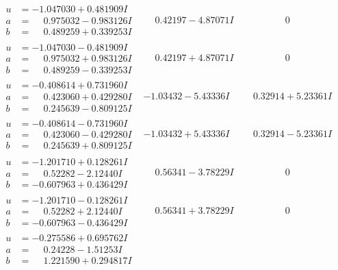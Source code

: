 \documentclass[1p]{elsarticle_modified}
\theoremstyle{definition}
\begin{document}
$$\begin{array}{c|c|c}
\begin{aligned}
u &= -1.047030 + 0.481909 I \\
a &= \phantom{-}0.975032 - 0.983126 I \\
b &= \phantom{-}0.489259 + 0.339253 I\end{aligned}
 & \phantom{-}0.42197 - 4.87071 I & \phantom{-0.000000 } 0 \\ \hline\begin{aligned}
u &= -1.047030 - 0.481909 I \\
a &= \phantom{-}0.975032 + 0.983126 I \\
b &= \phantom{-}0.489259 - 0.339253 I\end{aligned}
 & \phantom{-}0.42197 + 4.87071 I & \phantom{-0.000000 } 0 \\ \hline\begin{aligned}
u &= -0.408614 + 0.731960 I \\
a &= \phantom{-}0.423060 + 0.429280 I \\
b &= \phantom{-}0.245639 - 0.809125 I\end{aligned}
 & -1.03432 - 5.43336 I & \phantom{-}0.32914 + 5.23361 I \\ \hline\begin{aligned}
u &= -0.408614 - 0.731960 I \\
a &= \phantom{-}0.423060 - 0.429280 I \\
b &= \phantom{-}0.245639 + 0.809125 I\end{aligned}
 & -1.03432 + 5.43336 I & \phantom{-}0.32914 - 5.23361 I \\ \hline\begin{aligned}
u &= -1.201710 + 0.128261 I \\
a &= \phantom{-}0.52282 - 2.12440 I \\
b &= -0.607963 + 0.436429 I\end{aligned}
 & \phantom{-}0.56341 - 3.78229 I & \phantom{-0.000000 } 0 \\ \hline\begin{aligned}
u &= -1.201710 - 0.128261 I \\
a &= \phantom{-}0.52282 + 2.12440 I \\
b &= -0.607963 - 0.436429 I\end{aligned}
 & \phantom{-}0.56341 + 3.78229 I & \phantom{-0.000000 } 0 \\ \hline\begin{aligned}
u &= -0.275586 + 0.695762 I \\
a &= \phantom{-}0.24228 - 1.51253 I \\
b &= \phantom{-}1.221590 + 0.294817 I\end{aligned}

\end{array}$$
\end{document}
